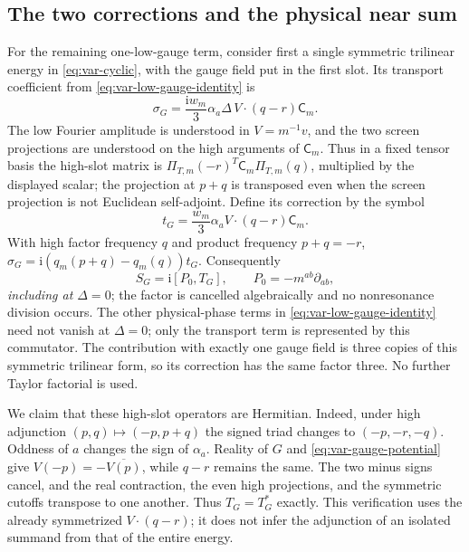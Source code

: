 \documentclass[11pt,a4paper]{article}
\numberwithin{equation}{section}
\newcommand{\f}[2]{\frac{#1}{#2}}
\newcommand{\ii}{\mathrm{i}}
\theoremstyle{definition}
\begin{document}
\subsection{The two corrections and the physical near sum}

For the remaining one-low-gauge term, consider first a single symmetric
trilinear energy in \eqref{eq:var-cyclic}, with the gauge field put in
the first slot. Its transport coefficient from
\eqref{eq:var-low-gauge-identity} is
\begin{equation*}
\sigma_G=\f{\ii w_m}{3}\alpha_a\Delta\,
              V\cdot(q-r)\mathsf C_m.
\end{equation*}
The low Fourier amplitude is understood in $V=m^{-1}v$, and the two
screen projections are understood on the high arguments of $\mathsf C_m$.
Thus in a fixed tensor basis the high-slot matrix is
$\Pi_{T,m}(-r)^T\mathsf C_m\Pi_{T,m}(q)$, multiplied by the displayed
scalar; the projection at $p+q$ is transposed even when the screen
projection is not Euclidean self-adjoint.
Define its correction by the symbol
\begin{equation}\label{eq:var-gauge-correction}
t_G=\f{w_m}{3}\alpha_a V\cdot(q-r)\mathsf C_m.
\end{equation}
With high factor frequency $q$ and product frequency $p+q=-r$,
$\sigma_G=\ii(q_m(p+q)-q_m(q))t_G$. Consequently
\begin{equation*}
S_G=\ii [P_0,T_G],\qquad P_0=-m^{ab}\partial_{ab},
\end{equation*}
\emph{including at $\Delta=0$}; the factor is cancelled algebraically
and no nonresonance division occurs. The other physical-phase terms in
\eqref{eq:var-low-gauge-identity} need not vanish at $\Delta=0$;
only the transport term is represented by this commutator.
The contribution with exactly one
gauge field is three copies of this symmetric trilinear form, so its
correction has the same factor three. No further Taylor factorial is used.

We claim that these high-slot operators are Hermitian.
Indeed, under high adjunction
$(p,q)\mapsto(-p,p+q)$ the signed triad changes to $(-p,-r,-q)$.
Oddness of $a$ changes the sign of $\alpha_a$. Reality of $G$ and
\eqref{eq:var-gauge-potential} give $V(-p)=-\overline{V(p)}$, while
$q-r$ remains the same. The two minus signs cancel, and the real
contraction, the even high projections, and the symmetric cutoffs
transpose to one another. Thus $T_G=T_G^*$ exactly. This verification
uses the already symmetrized $V\cdot(q-r)$; it does not infer the
adjunction of an isolated summand from that of the entire energy.
\end{document}
